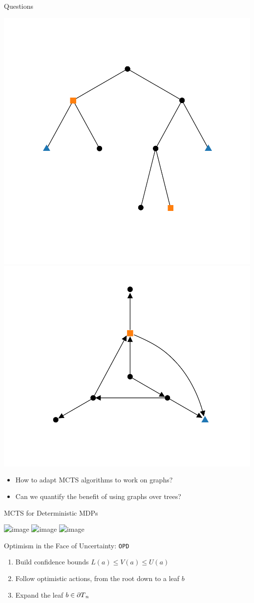 \documentclass[slideopt,A4,showboxes,svgnames]{beamer}
\begin{document}
\begin{frame}{Questions}
\begin{center}
	\includegraphics[trim={1.8cm 2.2cm 1.9cm 2.7cm}, clip,width=0.46\linewidth]{img/tree_simple}
	\includegraphics[trim={1.8cm 1.2cm 1.9cm 0.8cm}, clip,width=0.46\linewidth]{img/graph_simple}
\end{center}
\begin{itemize}
	\item How to \alert{adapt} MCTS algorithms to work on graphs?
	\item Can we \alert{quantify} the benefit of using graphs over trees?
\end{itemize}
\end{frame}

\begin{frame}{MCTS for Deterministic MDPs}
\begin{center}
	\includegraphics<1-3>[trim={1.8cm 1.5cm 1.9cm 2.7cm}, clip,width=0.35\linewidth]{../img/tree_1}%
	\includegraphics<4>[trim={1.8cm 1.5cm 1.9cm 2.7cm}, clip,width=0.35\linewidth]{img/tree_sample}%
	\includegraphics<5>[trim={1.8cm 1.5cm 1.9cm 2.7cm}, clip,width=0.35\linewidth]{img/tree_expand}%
\end{center}
\vspace*{-0.5cm}
\begin{block}{Optimism in the Face of Uncertainty: \texttt{OPD}}
\pause
\begin{enumerate}[<+->]
	\item Build \alert{confidence bounds} $L(a)\leq V(a) \leq U(a)$
	\item Follow \alert{optimistic} actions, from the root down to a leaf $b$
	\item \alert{Expand} the leaf $b\in{\partial T}_n$
\end{enumerate}
\end{block}
\end{frame}
\end{document}
